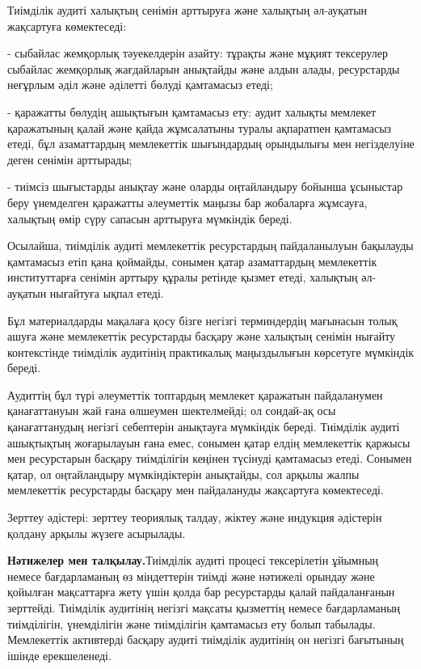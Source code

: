 \begin{multicols}{2}
Тиімділік аудиті халықтың сенімін арттыруға және халықтың әл-ауқатын
жақсартуға көмектеседі:

- сыбайлас жемқорлық тәуекелдерін азайту: тұрақты және мұқият тексерулер
сыбайлас жемқорлық жағдайларын анықтайды және алдын алады, ресурстарды
неғұрлым әділ және әділетті бөлуді қамтамасыз етеді;

- қаражатты бөлудің ашықтығын қамтамасыз ету: аудит халықты мемлекет
қаражатының қалай және қайда жұмсалатыны туралы ақпаратпен қамтамасыз
етеді, бұл азаматтардың мемлекеттік шығындардың орындылығы мен
негізделуіне деген сенімін арттырады;

- тиімсіз шығыстарды анықтау және оларды оңтайландыру бойынша ұсыныстар
беру үнемделген қаражатты әлеуметтік маңызы бар жобаларға жұмсауға,
халықтың өмір сүру сапасын арттыруға мүмкіндік береді.

Осылайша, тиімділік аудиті мемлекеттік ресурстардың пайдаланылуын
бақылауды қамтамасыз етіп қана қоймайды, сонымен қатар азаматтардың
мемлекеттік институттарға сенімін арттыру құралы ретінде қызмет етеді,
халықтың әл-ауқатын нығайтуға ықпал етеді.

Бұл материалдарды мақалаға қосу бізге негізгі терминдердің мағынасын
толық ашуға және мемлекеттік ресурстарды басқару және халықтың сенімін
нығайту контекстінде тиімділік аудитінің практикалық маңыздылығын
көрсетуге мүмкіндік береді.

Аудиттің бұл түрі әлеуметтік топтардың мемлекет қаражатын пайдаланумен
қанағаттануын жай ғана өлшеумен шектелмейді; ол сондай-ақ осы
қанағаттанудың негізгі себептерін анықтауға мүмкіндік береді. Тиімділік
аудиті ашықтықтың жоғарылауын ғана емес, сонымен қатар елдің мемлекеттік
қаржысы мен ресурстарын басқару тиімділігін кеңінен түсінуді қамтамасыз
етеді. Сонымен қатар, ол оңтайландыру мүмкіндіктерін анықтайды, сол
арқылы жалпы мемлекеттік ресурстарды басқару мен пайдалануды жақсартуға
көмектеседі.

Зерттеу әдістері: зерттеу теориялық талдау, жіктеу және индукция
әдістерін қолдану арқылы жүзеге асырылады.

{\bfseries Нәтижелер мен талқылау.}Тиімділік аудиті процесі тексерілетін
ұйымның немесе бағдарламаның өз міндеттерін тиімді және нәтижелі орындау
және қойылған мақсаттарға жету үшін қолда бар ресурстарды қалай
пайдаланғанын зерттейді. Тиімділік аудитінің негізгі мақсаты қызметтің
немесе бағдарламаның тиімділігін, үнемділігін және тиімділігін
қамтамасыз ету болып табылады. Мемлекеттік активтерді басқару аудиті
тиімділік аудитінің он негізгі бағытының ішінде ерекшеленеді.


\end{multicols}
